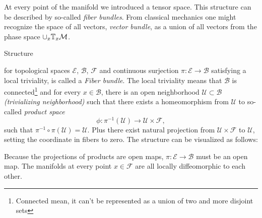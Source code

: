At every point of the manifold we introduced a tensor space. This structure can be described by so-called \emph{fiber bundles}. From classical mechanics one might recognize the space of all vectors, \emph{vector bundle}, as a union of all vectors from the phase space $\cup_x\mathbb{T}_x\mathcal{M}$.
\begin{definition}
    \label{def:fiberBundle}
    Structure 
\begin{center}
\end{center}
    for topological spaces $\mathcal{E}$, $\mathcal{B}$, $\mathcal F$ and continuous surjection $\pi: \mathcal{E}\rightarrow \mathcal{B}$ satisfying a local triviality, is called a \emph{Fiber bundle}. The local triviality means that $\mathcal{B}$ is connected\footnote{Connected mean, it can't be represented as a union of two and more disjoint sets} and for every $x\in \mathcal{B}$, there is an open neighborhood $\mathcal{U}\subset \mathcal{B}$ \emph{(trivializing neighborhood)} such that there exists a homeomorphism from $\mathcal{U}$ to so-called \emph{product space}
    $$\phi: \pi^{-1}(\mathcal{U})\rightarrow \mathcal{U}\times \mathcal{F},$$
    such that $\pi^{-1}\circ \pi(\mathcal{U})=\mathcal{U}$. Plus there exist natural projection from $\mathcal{U}\times \mathcal{F}$ to $\mathcal U$, setting the coordinate in fibers to zero. The structure can be visualized as follows: 

    \begin{figure}[H]
        \centering
    \end{figure}

\end{definition}
Because the projections of products are open maps, $\pi: \mathcal{E}\rightarrow \mathcal{B}$ must be an open map. The manifolds at every point $x\in \mathcal{F}$ are all locally diffeomorphic to each other.

